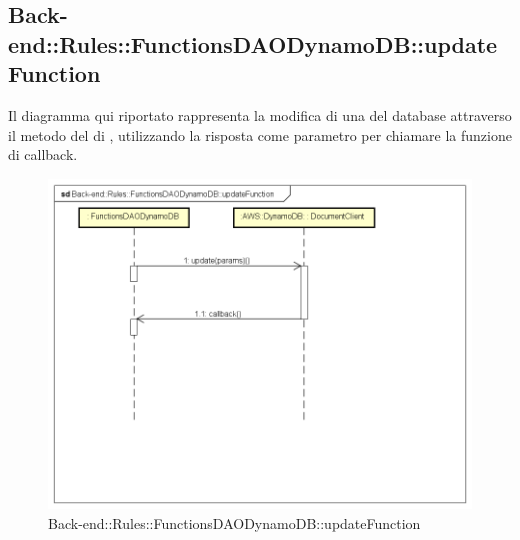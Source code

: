 \subsection{Back-end::Rules::FunctionsDAODynamoDB::updateFunction}
Il diagramma qui riportato rappresenta la modifica di una  del database attraverso il metodo  del  di , utilizzando la risposta come parametro per chiamare la funzione di callback.
 \begin{figure}[h] \centering \includegraphics[width=\textwidth,height=\textheight,keepaspectratio]{images/diagrams/back-end/Ufficial_Backend/Back-endRulesFunctionsDAODynamoDBupdateFunction.png} 	\caption{Back-end::Rules::FunctionsDAODynamoDB::updateFunction}
\end{figure}
\newpage

